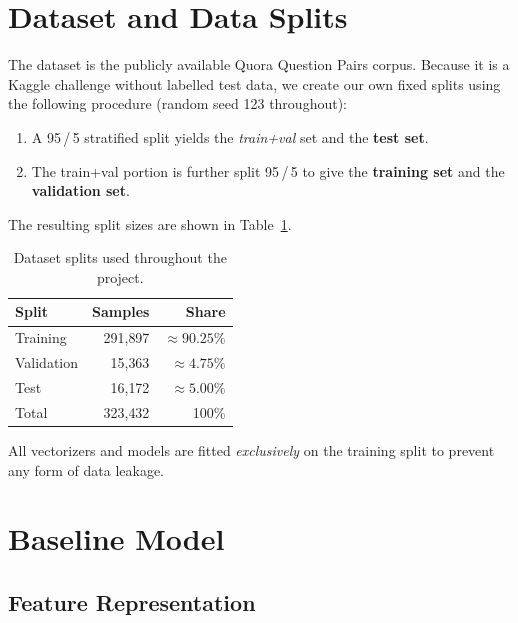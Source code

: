 \documentclass[11pt,a4paper]{article}
\begin{document}
\section{Dataset and Data Splits}
\label{sec:data}

The dataset is the publicly available Quora Question Pairs corpus. Because it is a Kaggle challenge without labelled test data, we create our own fixed splits using the following procedure (random seed 123 throughout):

\begin{enumerate}[leftmargin=*, label=\textbf{\arabic*.}]
    \item A 95\,/\,5 stratified split yields the \emph{train+val} set and the \textbf{test set}.
    \item The train+val portion is further split 95\,/\,5 to give the \textbf{training set} and the \textbf{validation set}.
\end{enumerate}

The resulting split sizes are shown in Table~\ref{tab:splits}.

\begin{table}[h]
\centering
\caption{Dataset splits used throughout the project.}
\label{tab:splits}
\begin{tabular}{lrr}
\toprule
\textbf{Split} & \textbf{Samples} & \textbf{Share} \\
\midrule
Training   & 291{,}897 & $\approx 90.25\%$ \\
Validation &  15{,}363 & $\approx 4.75\%$  \\
Test       &  16{,}172 & $\approx 5.00\%$  \\
\midrule
Total      & 323{,}432 & 100\%             \\
\bottomrule
\end{tabular}
\end{table}

All vectorizers and models are fitted \emph{exclusively} on the training split to prevent any form of data leakage.

\section{Baseline Model}
\label{sec:baseline}

\subsection{Feature Representation}
\end{document}
